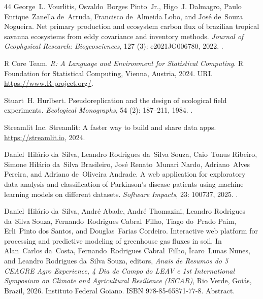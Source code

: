\documentclass[11pt, letterpaper]{article}
\begin{document}
\begin{thebibliography}{44}
George~L. Vourlitis, Osvaldo~Borges Pinto~Jr., Higo~J. Dalmagro, Paulo Enrique~Zanella de~Arruda, Francisco de~Almeida Lobo, and Jos{\'e} de~Souza Nogueira.
\newblock Net primary production and ecosystem carbon flux of brazilian tropical savanna ecosystems from eddy covariance and inventory methods.
\newblock \emph{Journal of Geophysical Research: Biogeosciences}, 127 (3): e2021JG006780, 2022.
\newblock {}.

{R Core Team}.
\newblock \emph{R: A Language and Environment for Statistical Computing}.
\newblock R Foundation for Statistical Computing, Vienna, Austria, 2024.
\newblock URL \url{https://www.R-project.org/}.

Stuart~H. Hurlbert.
\newblock Pseudoreplication and the design of ecological field experiments.
\newblock \emph{Ecological Monographs}, 54 (2): 187--211, 1984.
\newblock {}.

{Streamlit Inc.}
\newblock Streamlit: A faster way to build and share data apps.
\newblock \url{https://streamlit.io}, 2024.

Daniel~Hil{\'a}rio da~Silva, Leandro Rodrigues da~Silva Souza, Caio~Tonus Ribeiro, Simone Hil{\'a}rio da~Silva Brasileiro, Jos{\'e} Renato~Munari Nardo, Adriano~Alves Pereira, and Adriano de~Oliveira Andrade.
\newblock A web application for exploratory data analysis and classification of {P}arkinson's disease patients using machine learning models on different datasets.
\newblock \emph{Software Impacts}, 23: 100737, 2025.
\newblock {}.

Daniel~Hil{\'a}rio da~Silva, Andr{\'e} Abade, Andr{\'e} Thomazini, Leandro Rodrigues da~Silva Souza, Fernando~Rodrigues Cabral~Filho, Tiago do~Prado Paim, Erli~Pinto dos Santos, and Douglas~Farias Cordeiro.
\newblock Interactive web platform for processing and predictive modeling of greenhouse gas fluxes in soil.
\newblock In Alan~Carlos da~Costa, Fernando~Rodrigues Cabral~Filho, {\'I}caro~Lunas Nunes, and Leandro Rodrigues da~Silva Souza, editors, \emph{Anais de Resumos do 5\textordmasculine{} CEAGRE Agro Experience, 4\textordmasculine{} Dia de Campo do LEAV e 1st International Symposium on Climate and Agricultural Resilience (ISCAR)}, Rio Verde, Goi{\'a}s, Brazil, 2026. Instituto Federal Goiano.
\newblock ISBN 978-85-65871-77-8.
\newblock Abstract.


\end{thebibliography}
\end{document}
